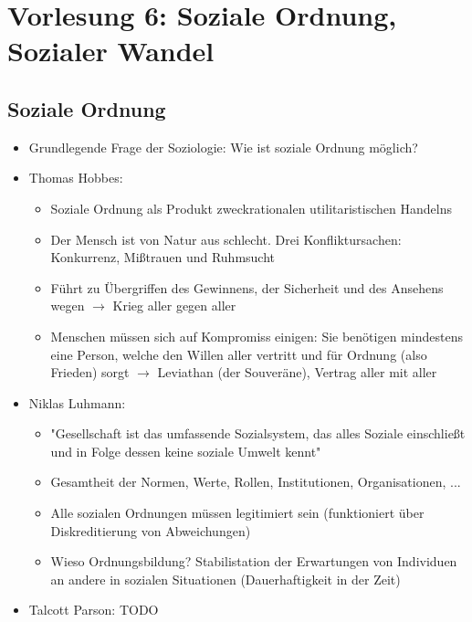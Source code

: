 \documentclass{scrartcl}
\begin{document}
\newpage

\section*{Vorlesung 6: Soziale Ordnung, Sozialer Wandel}
\subsection*{Soziale Ordnung}
\begin{itemize}
    \item
	Grundlegende Frage der Soziologie: Wie ist soziale Ordnung möglich?
    \item
	Thomas Hobbes:
	\begin{itemize}
	    \item
		Soziale Ordnung als Produkt zweckrationalen utilitaristischen Handelns
	    \item
		Der Mensch ist von Natur aus schlecht. Drei Konfliktursachen: Konkurrenz, Mißtrauen und Ruhmsucht
	    \item
		Führt zu Übergriffen des Gewinnens, der Sicherheit und des Ansehens wegen $\rightarrow$ Krieg aller gegen aller
	    \item
		Menschen müssen sich auf Kompromiss einigen: Sie benötigen mindestens eine Person, welche den Willen aller vertritt und für Ordnung (also Frieden) sorgt $\rightarrow$ Leviathan (der Souveräne), Vertrag aller mit aller
	\end{itemize}
    \item
	Niklas Luhmann:
	\begin{itemize}
	    \item
		"Gesellschaft ist das umfassende Sozialsystem, das alles Soziale einschließt und in Folge dessen keine soziale Umwelt kennt"
	    \item
		Gesamtheit der Normen, Werte, Rollen, Institutionen, Organisationen, ...
	    \item
		Alle sozialen Ordnungen müssen legitimiert sein (funktioniert über Diskreditierung von Abweichungen)
	    \item
		Wieso Ordnungsbildung? Stabilistation der Erwartungen von Individuen an andere in sozialen Situationen (Dauerhaftigkeit in der Zeit)
	\end{itemize}
    \item
	Talcott Parson: TODO
\end{itemize}
\end{document}
